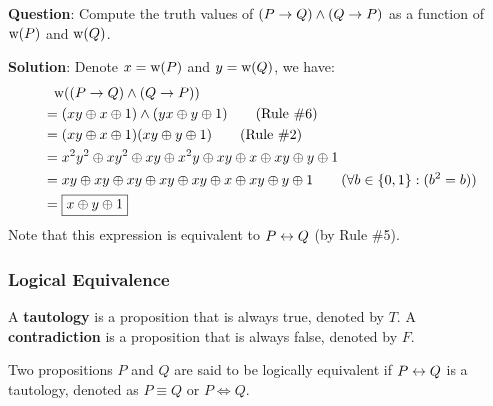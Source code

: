 \begin{example}
    \textbf{Question}: Compute the truth values of $(P \rightarrow Q) \wedge (Q \rightarrow P)$ as a function of
    $\text{w(}P\text{)}$ and $\text{w(}Q\text{)}$.

    \textbf{Solution}: Denote $x=\text{w(}P\text{)}$ and $y=\text{w(}Q\text{)}$, we have:
    \begin{align*}
        &\phantom{\mathrel{=}} \lTV{(P \lImp Q) \lAnd (Q \lImp P)} \\
        &= (xy \lXor x \lXor 1) \lAnd (yx \lXor y \lXor 1) \qquad\text{(Rule \#6)} \\
        &= (xy \lXor x \lXor 1)(xy \lXor y \lXor 1) \qquad\text{(Rule \#2)} \\
        &= x^2y^2 \lXor xy^2 \lXor xy \lXor x^2y \lXor xy \lXor x \lXor xy \lXor y \lXor 1 \\
        &= xy \lXor xy \lXor xy \lXor xy \lXor xy \lXor x \lXor xy \lXor y \lXor 1 \qquad\text{(}\forall b\in\{0, 1\}:(b^2 = b)\text{)}\\
        &= \boxed{x \lXor y \lXor 1}
    \end{align*}
    Note that this expression is equivalent to $P \leftrightarrow Q$ (by Rule \#5).
\end{example}

\subsubsection{Logical Equivalence}

\begin{definition}
    A \textbf{tautology} is a proposition that is always true, denoted by $T$.
    A \textbf{contradiction} is a proposition that is always false, denoted by $F$.
\end{definition}

\begin{definition}
    Two propositions $P$ and $Q$ are said to be logically equivalent if $P \leftrightarrow Q$ is a tautology,
    denoted as $P \equiv Q$ or $P \Leftrightarrow Q$.
\end{definition}

